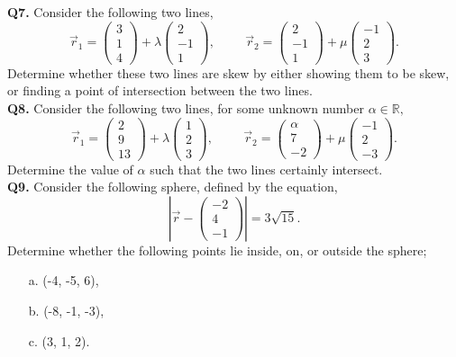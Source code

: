 \documentclass{article}
\begin{document}
\textbf{Q7.} Consider the following two lines,
$$
\vec{r}_1 = 
\begin{pmatrix}
    3 \\ 1 \\ 4
\end{pmatrix}
+ \lambda
\begin{pmatrix}
    2 \\ -1 \\ 1
\end{pmatrix}, \hspace{1cm}
\vec{r}_2 = 
\begin{pmatrix}
    2 \\ -1 \\ 1
\end{pmatrix}
+ \mu
\begin{pmatrix}
    -1 \\ 2 \\ 3
\end{pmatrix}.
$$
Determine whether these two lines are skew by either showing them to be skew, or finding a point of intersection between the two lines. \\

\textbf{Q8.} Consider the following two lines, for some unknown number $\alpha \in \mathbb{R},$
$$
\vec{r}_1 = 
\begin{pmatrix}
    2 \\ 9 \\ 13
\end{pmatrix} + \lambda
\begin{pmatrix}
    1 \\ 2 \\ 3
\end{pmatrix}, \hspace{1cm}
\vec{r}_2 =
\begin{pmatrix}
    \alpha \\ 7 \\ -2
\end{pmatrix} + \mu
\begin{pmatrix}
    -1 \\ 2 \\ -3
\end{pmatrix}.
$$
Determine the value of $\alpha$ such that the two lines certainly intersect. \\

\textbf{Q9.} Consider the following sphere, defined by the equation,
$$
\left|
\vec{r} -
\begin{pmatrix}
    -2 \\ 4 \\ -1
\end{pmatrix}
\right| = 3\sqrt{15}.
$$
Determine whether the following points lie inside, on, or outside the sphere;
\begin{enumerate}
    \item[a.] (-4, -5, 6),
    \item[b.] (-8, -1, -3),
    \item[c.] (3, 1, 2).
\end{enumerate}
\end{document}
